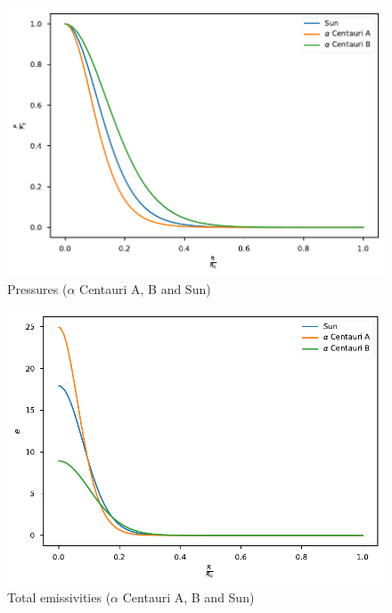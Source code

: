 \documentclass{aa}
\begin{document}
\begin{figure}
  \centering
  \includegraphics[width=\linewidth]{../figures/pressures.pdf}
  \caption{Pressures ($\alpha$ Centauri A, B and Sun)}
  \label{fig:pressures}
\end{figure}
\begin{figure}
  \centering
  \includegraphics[width=\linewidth]{../figures/emissivities.pdf}
  \caption{Total emissivities ($\alpha$ Centauri A, B and Sun)}
  \label{fig:emissivities}
\end{figure}
\end{document}
